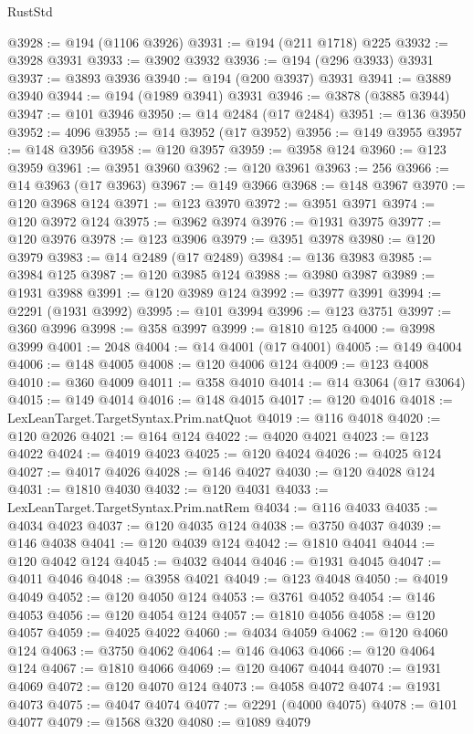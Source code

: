 \begin{lexlean}{RustStd}
\begin{coremodule}
@3928 := @194 (@1106 @3926)
@3931 := @194 (@211 @1718) @225
@3932 := @3928 @3931
@3933 := @3902 @3932
@3936 := @194 (@296 @3933) @3931
@3937 := @3893 @3936
@3940 := @194 (@200 @3937) @3931
@3941 := @3889 @3940
@3944 := @194 (@1989 @3941) @3931
@3946 := @3878 (@3885 @3944)
@3947 := @101 @3946
@3950 := @14 @2484 (@17 @2484)
@3951 := @136 @3950
@3952 := 4096
@3955 := @14 @3952 (@17 @3952)
@3956 := @149 @3955
@3957 := @148 @3956
@3958 := @120 @3957
@3959 := @3958 @124
@3960 := @123 @3959
@3961 := @3951 @3960
@3962 := @120 @3961
@3963 := 256
@3966 := @14 @3963 (@17 @3963)
@3967 := @149 @3966
@3968 := @148 @3967
@3970 := @120 @3968 @124
@3971 := @123 @3970
@3972 := @3951 @3971
@3974 := @120 @3972 @124
@3975 := @3962 @3974
@3976 := @1931 @3975
@3977 := @120 @3976
@3978 := @123 @3906
@3979 := @3951 @3978
@3980 := @120 @3979
@3983 := @14 @2489 (@17 @2489)
@3984 := @136 @3983
@3985 := @3984 @125
@3987 := @120 @3985 @124
@3988 := @3980 @3987
@3989 := @1931 @3988
@3991 := @120 @3989 @124
@3992 := @3977 @3991
@3994 := @2291 (@1931 @3992)
@3995 := @101 @3994
@3996 := @123 @3751
@3997 := @360 @3996
@3998 := @358 @3997
@3999 := @1810 @125
@4000 := @3998 @3999
@4001 := 2048
@4004 := @14 @4001 (@17 @4001)
@4005 := @149 @4004
@4006 := @148 @4005
@4008 := @120 @4006 @124
@4009 := @123 @4008
@4010 := @360 @4009
@4011 := @358 @4010
@4014 := @14 @3064 (@17 @3064)
@4015 := @149 @4014
@4016 := @148 @4015
@4017 := @120 @4016
@4018 := LexLeanTarget.TargetSyntax.Prim.natQuot
@4019 := @116 @4018
@4020 := @120 @2026
@4021 := @164 @124
@4022 := @4020 @4021
@4023 := @123 @4022
@4024 := @4019 @4023
@4025 := @120 @4024
@4026 := @4025 @124
@4027 := @4017 @4026
@4028 := @146 @4027
@4030 := @120 @4028 @124
@4031 := @1810 @4030
@4032 := @120 @4031
@4033 := LexLeanTarget.TargetSyntax.Prim.natRem
@4034 := @116 @4033
@4035 := @4034 @4023
@4037 := @120 @4035 @124
@4038 := @3750 @4037
@4039 := @146 @4038
@4041 := @120 @4039 @124
@4042 := @1810 @4041
@4044 := @120 @4042 @124
@4045 := @4032 @4044
@4046 := @1931 @4045
@4047 := @4011 @4046
@4048 := @3958 @4021
@4049 := @123 @4048
@4050 := @4019 @4049
@4052 := @120 @4050 @124
@4053 := @3761 @4052
@4054 := @146 @4053
@4056 := @120 @4054 @124
@4057 := @1810 @4056
@4058 := @120 @4057
@4059 := @4025 @4022
@4060 := @4034 @4059
@4062 := @120 @4060 @124
@4063 := @3750 @4062
@4064 := @146 @4063
@4066 := @120 @4064 @124
@4067 := @1810 @4066
@4069 := @120 @4067 @4044
@4070 := @1931 @4069
@4072 := @120 @4070 @124
@4073 := @4058 @4072
@4074 := @1931 @4073
@4075 := @4047 @4074
@4077 := @2291 (@4000 @4075)
@4078 := @101 @4077
@4079 := @1568 @320
@4080 := @1089 @4079

\end{coremodule}
\end{lexlean}
